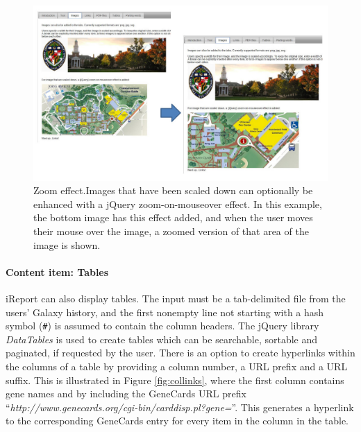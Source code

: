 \begin{figure}[h!]
    \includegraphics[width=\textwidth]{chapters/images/iReport/Hiltemann_zoomeffect.jpg}
    \caption{Zoom effect.Images that have been scaled down can optionally be enhanced with a jQuery zoom-on-mouseover effect. In this example, the bottom image has this effect added, and when the user moves their mouse over the image, a zoomed version of that area of the image is shown. }
    \label{fig:imagezoom}
\end{figure}

\paragraph*{Content item: Tables}
iReport can also display tables. The input must be a tab-delimited file from the users' Galaxy history, and the first nonempty line not starting with a hash symbol (\verb+#+) is assumed to contain the column headers. The jQuery library \emph{DataTables} \cite{url-datatables} is used to create tables which can be searchable, sortable and paginated, if requested by the user. There is an option to create hyperlinks within the columns of a table by providing a column number, a URL prefix and a URL suffix. This is illustrated in Figure \ref{fig:collinks}, where the first column contains gene names and by including the GeneCards \cite{genecardspaper,url-genecards} URL prefix ``\emph{http://www.genecards.org/cgi-bin/carddisp.pl?gene=}''. This generates a hyperlink to the corresponding GeneCards entry for every item in the column in the table.

